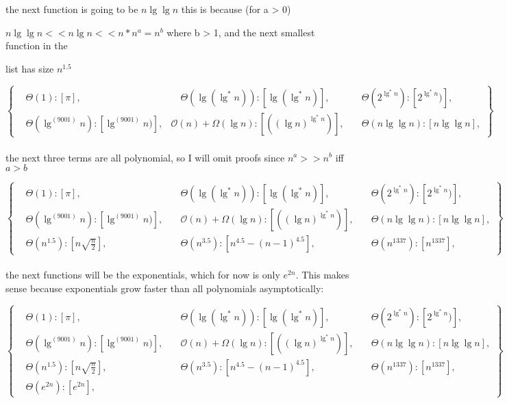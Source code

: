 \documentclass[11pt,fleqn]{article}
\theoremstyle{definition}
\theoremstyle{remark}
\begin{document}
the next function is going to be $n\lg \lg n$ this is because (for a > 0)

$n\lg \lg n << n\lg n << n * n^a = n^b$ where b > 1, and the next smallest function in the 

list has size $n^{1.5}$

\[
\left\{
\begin{aligned}
& \Theta(1): [\pi],
& \quad \Theta(\lg(\lg^*n)): [\lg(\lg^*n)],
& \quad \Theta(2^{\lg^*n}): [2^{\lg^*n})],\\
& \Theta(\lg^{(9001)} n): [\lg^{(9001)} n)],
& \mathcal{O}(n)+\Omega(\lg n): [({(\lg n)}^{\lg^*{n}})],
& \quad \Theta(n\lg \lg n): [n\lg \lg n],
\end{aligned}
\right\}
\]\\

the next three terms are all polynomial, so I will omit proofs since
$n^a >> n^b$ iff $a > b$

\[
\left\{
\begin{aligned}
& \Theta(1): [\pi],
& \quad \Theta(\lg(\lg^*n)): [\lg(\lg^*n)],
& \quad \Theta(2^{\lg^*n}): [2^{\lg^*n})],\\
& \Theta(\lg^{(9001)} n): [\lg^{(9001)} n)],
& \quad \mathcal{O}(n)+\Omega(\lg n): [({(\lg n)}^{\lg^*{n}})],
& \quad \Theta(n\lg \lg n): [n\lg \lg n],\\
& \Theta(n^{1.5}): [n\sqrt{\frac{n}{2}}],
& \quad \Theta(n^{3.5}): [n^{4.5} - (n - 1)^{4.5}], 
& \quad\Theta(n^{1337}): [n^{1337}],
\end{aligned}
\right\}
\]\\

the next functions will be the exponentials, which for now
is only $e^{2n}$. This makes sense because exponentials grow faster
than all polynomials asymptotically:

\[
\left\{
\begin{aligned}
& \Theta(1): [\pi],
& \quad \Theta(\lg(\lg^*n)): [\lg(\lg^*n)],
& \quad \Theta(2^{\lg^*n}): [2^{\lg^*n})],\\
& \Theta(\lg^{(9001)} n): [\lg^{(9001)} n)],
& \quad \mathcal{O}(n)+\Omega(\lg n): [({(\lg n)}^{\lg^*{n}})],
& \quad \Theta(n\lg \lg n): [n\lg \lg n],\\
& \Theta(n^{1.5}): [n\sqrt{\frac{n}{2}}],
& \quad \Theta(n^{3.5}): [n^{4.5} - (n - 1)^{4.5}], 
& \quad \Theta(n^{1337}): [n^{1337}],\\
& \Theta(e^{2n}): [e^{2n}],
\end{aligned}
\right\}
\]\\
\end{document}
